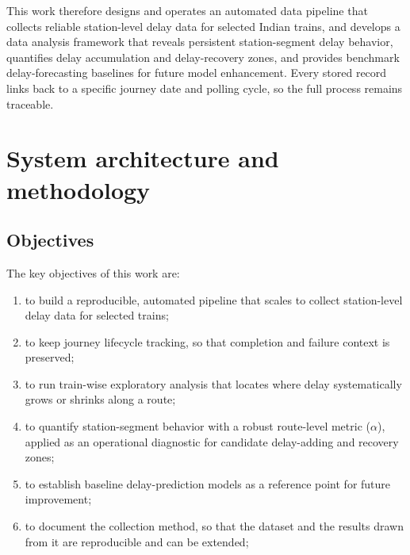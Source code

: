 \documentclass[a4paper,fleqn]{cas-dc}
\begin{document}
This work therefore designs and operates an automated data pipeline that
collects reliable station-level delay data for selected Indian trains, and
develops a data analysis framework that reveals persistent station-segment
delay behavior, quantifies delay accumulation and delay-recovery zones, and
provides benchmark delay-forecasting baselines for future model enhancement.
Every stored record links back to a specific journey date and polling cycle,
so the full process remains traceable.

\section{System architecture and methodology}
\label{sec:proposed}

\subsection{Objectives}
The key objectives of this work are:
\begin{enumerate}
    \item to build a reproducible, automated pipeline that scales to collect
          station-level delay data for selected trains;
    \item to keep journey lifecycle tracking, so that completion and
          failure context is preserved;
    \item to run train-wise exploratory analysis that locates where delay
          systematically grows or shrinks along a route;
    \item to quantify station-segment behavior with a robust route-level
          metric ($\alpha$), applied as an operational diagnostic for
          candidate delay-adding and recovery zones;
    \item to establish baseline delay-prediction models as a reference
          point for future improvement;
    \item to document the collection method, so that the dataset and the
          results drawn from it are reproducible and can be extended;
\end{enumerate}
\end{document}
